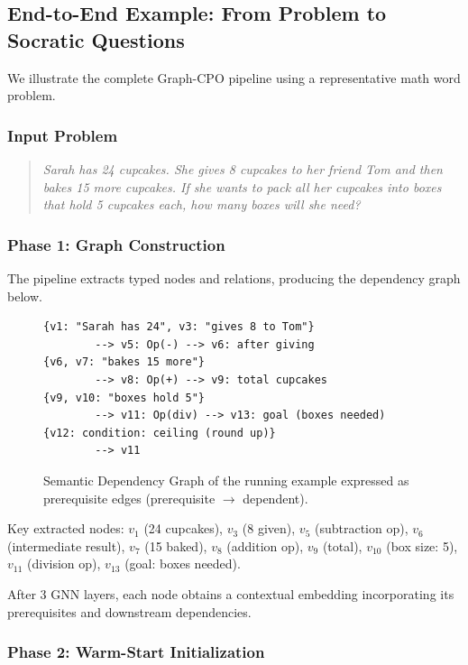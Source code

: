 \documentclass[sigconf, anonymous, review, screen]{acmart}
\begin{document}
\subsection{End-to-End Example: From Problem to Socratic Questions}\label{app:example}

We illustrate the complete Graph-CPO pipeline using a representative math word problem.

\subsubsection{Input Problem}

\begin{quote}
\textit{Sarah has 24 cupcakes. She gives 8 cupcakes to her friend Tom and then bakes 15 more cupcakes. If she wants to pack all her cupcakes into boxes that hold 5 cupcakes each, how many boxes will she need?}
\end{quote}

\subsubsection{Phase 1: Graph Construction}

The pipeline extracts typed nodes and relations, producing the dependency graph below.

\begin{figure}[h]
\centering
\small
\begin{verbatim}
{v1: "Sarah has 24", v3: "gives 8 to Tom"}
        --> v5: Op(-) --> v6: after giving
{v6, v7: "bakes 15 more"}
        --> v8: Op(+) --> v9: total cupcakes
{v9, v10: "boxes hold 5"}
        --> v11: Op(div) --> v13: goal (boxes needed)
{v12: condition: ceiling (round up)}
        --> v11
\end{verbatim}
\caption{Semantic Dependency Graph of the running example expressed as prerequisite edges (prerequisite $\rightarrow$ dependent).}
\label{fig:example_dag}
\end{figure}

Key extracted nodes: $v_1$ (24 cupcakes), $v_3$ (8 given), $v_5$ (subtraction op), $v_6$ (intermediate result), $v_7$ (15 baked), $v_8$ (addition op), $v_9$ (total), $v_{10}$ (box size: 5), $v_{11}$ (division op), $v_{13}$ (goal: boxes needed).

After 3 GNN layers, each node obtains a contextual embedding incorporating its prerequisites and downstream dependencies.

\subsubsection{Phase 2: Warm-Start Initialization}
\end{document}
